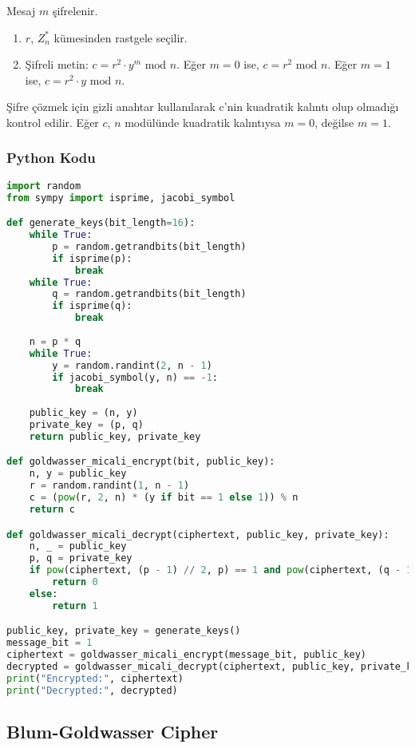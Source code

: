 Mesaj $m$ şifrelenir.

\begin{enumerate}
    \item $r$, $Z_{n}^{*}$ kümesinden rastgele seçilir.
    \item Şifreli metin: $c = r^2 \cdot y^m \text{ mod } n$. Eğer $m = 0$ ise, $c = r^2 \text{ mod } n$. Eğer $m = 1$ ise, $c = r^2 \cdot y \text{ mod } n$.
\end{enumerate}

Şifre çözmek için gizli anahtar kullanılarak c'nin kuadratik kalıntı olup olmadığı kontrol edilir. Eğer $c$, $n$ modülünde kuadratik kalıntıysa $m = 0$, değilse $m = 1$.

\subsubsection{Python Kodu}

\begin{lstlisting}[language=Python]
import random
from sympy import isprime, jacobi_symbol

def generate_keys(bit_length=16):
    while True:
        p = random.getrandbits(bit_length)
        if isprime(p):
            break
    while True:
        q = random.getrandbits(bit_length)
        if isprime(q):
            break
    
    n = p * q 
    while True:
        y = random.randint(2, n - 1)
        if jacobi_symbol(y, n) == -1:
            break
    
    public_key = (n, y)
    private_key = (p, q)
    return public_key, private_key

def goldwasser_micali_encrypt(bit, public_key):
    n, y = public_key
    r = random.randint(1, n - 1)
    c = (pow(r, 2, n) * (y if bit == 1 else 1)) % n
    return c

def goldwasser_micali_decrypt(ciphertext, public_key, private_key):
    n, _ = public_key
    p, q = private_key
    if pow(ciphertext, (p - 1) // 2, p) == 1 and pow(ciphertext, (q - 1) // 2, q) == 1:
        return 0
    else:
        return 1

public_key, private_key = generate_keys()
message_bit = 1
ciphertext = goldwasser_micali_encrypt(message_bit, public_key)
decrypted = goldwasser_micali_decrypt(ciphertext, public_key, private_key)
print("Encrypted:", ciphertext)
print("Decrypted:", decrypted)
\end{lstlisting}

\newpage

\subsection{Blum-Goldwasser Cipher}

